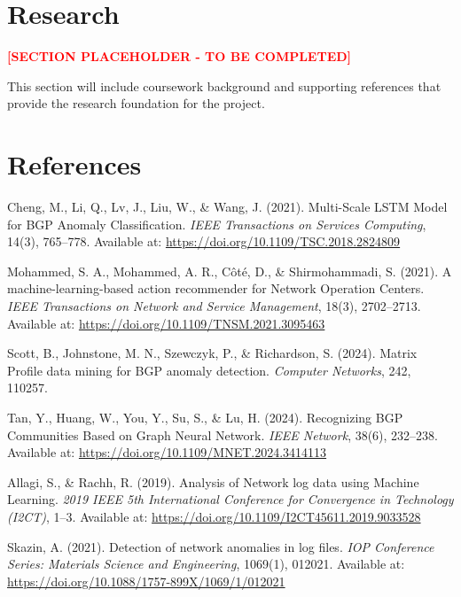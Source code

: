 \documentclass[11pt]{article}
\begin{document}
\section{Research}

\textcolor{red}{\textbf{[SECTION PLACEHOLDER - TO BE COMPLETED]}}

This section will include coursework background and supporting references that provide the research foundation for the project.

\section{References}

\begin{thebibliography}{9}

Cheng, M., Li, Q., Lv, J., Liu, W., \& Wang, J. (2021).
Multi-Scale LSTM Model for BGP Anomaly Classification.
\textit{IEEE Transactions on Services Computing}, 14(3), 765--778.
Available at: \href{https://doi.org/10.1109/TSC.2018.2824809}{https://doi.org/10.1109/TSC.2018.2824809}

Mohammed, S. A., Mohammed, A. R., Côté, D., \& Shirmohammadi, S. (2021).
A machine-learning-based action recommender for Network Operation Centers.
\textit{IEEE Transactions on Network and Service Management}, 18(3), 2702--2713.
Available at: \href{https://doi.org/10.1109/TNSM.2021.3095463}{https://doi.org/10.1109/TNSM.2021.3095463}

Scott, B., Johnstone, M. N., Szewczyk, P., \& Richardson, S. (2024).
Matrix Profile data mining for BGP anomaly detection.
\textit{Computer Networks}, 242, 110257.

Tan, Y., Huang, W., You, Y., Su, S., \& Lu, H. (2024).
Recognizing BGP Communities Based on Graph Neural Network.
\textit{IEEE Network}, 38(6), 232--238.
Available at: \href{https://doi.org/10.1109/MNET.2024.3414113}{https://doi.org/10.1109/MNET.2024.3414113}

Allagi, S., \& Rachh, R. (2019).
Analysis of Network log data using Machine Learning.
\textit{2019 IEEE 5th International Conference for Convergence in Technology (I2CT)}, 1--3.
Available at: \href{https://doi.org/10.1109/I2CT45611.2019.9033528}{https://doi.org/10.1109/I2CT45611.2019.9033528}

Skazin, A. (2021).
Detection of network anomalies in log files.
\textit{IOP Conference Series: Materials Science and Engineering}, 1069(1), 012021.
Available at: \href{https://doi.org/10.1088/1757-899X/1069/1/012021}{https://doi.org/10.1088/1757-899X/1069/1/012021}


\end{thebibliography}
\end{document}

